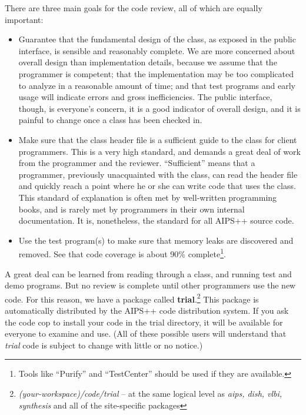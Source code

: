 There are three main goals for the code review, all of which are equally 
important:
\begin{itemize}
  \item Guarantee that the fundamental design of the class, as exposed
        in the public interface, is sensible and reasonably complete.  
        We are more concerned about overall design than implementation
        details, because we assume that the programmer is competent; that the 
        implementation may be too complicated to analyze in a reasonable
        amount of time; and that test programs and early usage will indicate 
        errors and gross inefficiencies.  The public interface, though, is
        everyone's  concern, it is a good indicator of overall design, and
         it is painful to change once a class has been checked in.
  \item Make sure that the class header file is a sufficient guide to
        the class for client programmers.  This is a very high standard,
        and demands a great deal of work from the programmer and the 
        reviewer.  ``Sufficient'' means that a programmer,
        previously unacquainted with the class, can read the header file
        and quickly reach a point where he or she can write code that uses 
        the class.  This standard of explanation is often met by well-written 
        programming books, and is rarely  met by programmers in their own 
        internal documentation.  It is, nonetheless, the standard for all 
        AIPS++ source code.
  \item Use the test program(s) to make sure that memory leaks are 
        discovered and removed. See that code coverage is about 90\% 
        complete\footnote {Tools like ``Purify'' and ``TestCenter''
        should be used if they are available.}.  
\end{itemize}

A great deal can be learned from reading through a class, and
running test and demo programs.  But no review is complete until
other programmers use the new code.  For this reason, we have a 
package called {\bf trial}.\footnote
{{\it (your-workspace)/code/trial} -- at the same logical level as
{\it aips, dish, vlbi, synthesis} and all of the site-specific packages}
This package is automatically distributed by the AIPS++ code distribution
system.  If you ask the code cop to install your code in the trial
directory, it will be available for everyone to examine and use.  (All
of these possible users will understand that {\it trial} code is subject
to change with little or no notice.)
